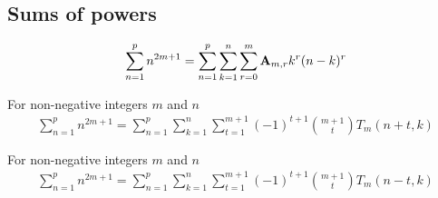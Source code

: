 \subsection{Sums of powers}\label{subsec:sums-of-powers}
\begin{proposition}
    \label{prop:sum-of-odd-powers}
    \begin{align*}
        \sum_{n=1}^{p} n^{2m+1} = \sum_{n=1}^{p} \sum_{k=1}^{n} \sum_{r=0}^{m} {\mathbf{A}} \sb{m,r} k^r (n-k)^r
    \end{align*}
\end{proposition}

\begin{proposition}
    \label{prop:sum-odd-power-decomposition-forward}
    For non-negative integers $m$ and $n$
    \begin{align*}
        \sum_{n=1}^{p} n^{2m+1} = \sum_{n=1}^{p} \sum_{k=1}^{n} \sum_{t=1}^{m+1} (-1)^{t+1} \binom{m+1}{t} T_{m} (n+t, k)
    \end{align*}
\end{proposition}

\begin{proposition}
    \label{prop:sum-odd-power-decomposition-backward}
    For non-negative integers $m$ and $n$
    \begin{align*}
        \sum_{n=1}^{p} n^{2m+1} = \sum_{n=1}^{p} \sum_{k=1}^{n} \sum_{t=1}^{m+1} (-1)^{t+1} \binom{m+1}{t} T_{m} (n-t, k)
    \end{align*}
\end{proposition}
